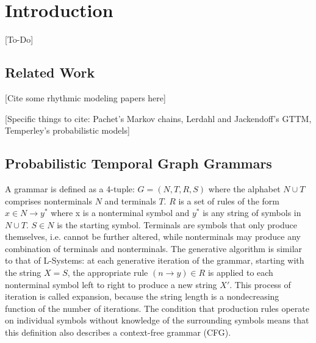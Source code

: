 \documentclass{article}
\title{\papertitle}
\begin{document}
%
\capstartfalse
\maketitle
\capstarttrue
%
\begin{abstract}
[Will need to be tweaked at the end to reflect any additions, but the original intro seems like a good fit here at the moment]

We present an approach for generating passages of rhythm via the use of a probabilistic temporal graph grammar with rule sets that operate via recursive subdivision. This project is motivated by three factors: (1) the recognition that the literature on computer-generated rhythm is generally not as robust as those for melody and harmony; (2) my desire as a composer of avant-garde classical music to have more tools for computer-assisted composition; and (3) the hope that such an approach, having already produced compelling results for some styles of music, may provide insight into the structure of rhythms found in existing repertoires.
\end{abstract}
%

\section{Introduction}\label{sec:introduction}

[To-Do]

\subsection{Related Work}

[Cite some rhythmic modeling papers here]

[Specific things to cite: Pachet's Markov chains, Lerdahl and Jackendoff's GTTM, Temperley's probabilistic models]

\subsection{Probabilistic Temporal Graph Grammars}

A grammar is defined as a 4-tuple: $G= (N,T,R,S)$ where the alphabet $N \cup T$ comprises nonterminals $N$ and terminals $T$. $R$ is a set of rules of the form $x \in N \rightarrow y^{*}$ where x is a nonterminal symbol and $y^*$ is any string of symbols in $N \cup T$. $S \in N$ is the starting symbol. Terminals are symbols that only produce themselves, i.e. cannot be further altered, while nonterminals may produce any combination of terminals and nonterminals. The generative algorithm is similar to that of L-Systems: at each generative iteration of the grammar, starting with the string $X=S$, the appropriate rule $(n \rightarrow y) \in R$ is applied to each nonterminal symbol left to right to produce a new string $X'$. This process of iteration is called expansion, because the string length is a nondecreasing function of the number of iterations. The condition that production rules operate on individual symbols without knowledge of the surrounding symbols means that this definition also describes a context-free grammar (CFG).
\end{document}
